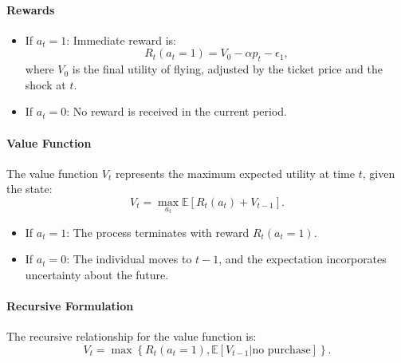 \documentclass[12pt]{article}
\begin{document}
\paragraph{Rewards}
\begin{itemize}
    \item If \( a_t = 1 \): Immediate reward is:
          \[
              R_t(a_t = 1) = V_0 - \alpha p_t - \epsilon_1,
          \]
          where \( V_0 \) is the final utility of flying, adjusted by the ticket price
          and the shock at \( t \).
    \item If \( a_t = 0 \): No reward is received in the current period.
\end{itemize}

\paragraph{Value Function} The value function \( V_t \) represents the maximum expected utility at time \(
t \), given the state:
\[
    V_t = \max_{a_t} \mathbb{E}[R_t(a_t) + V_{t-1}].
\]
\begin{itemize}
    \item If \( a_t = 1 \): The process terminates with reward \( R_t(a_t = 1) \).
    \item If \( a_t = 0 \): The individual moves to \( t - 1 \), and the expectation
          incorporates uncertainty about the future.
\end{itemize}

\paragraph{Recursive Formulation}
The recursive relationship for the value function is:
\[
    V_t = \max \left\{ R_t(a_t = 1), \mathbb{E}[V_{t-1} | \text{no purchase}] \right\}.
\]
\end{document}
